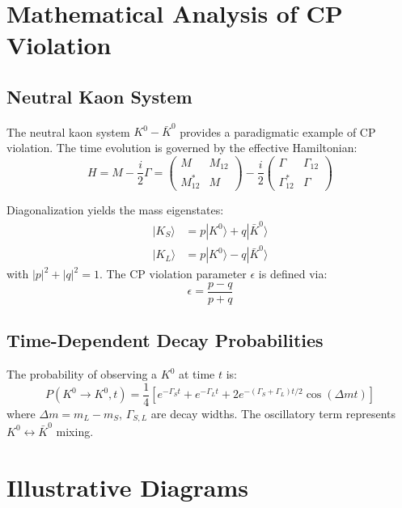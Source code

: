 \documentclass[12pt,a4paper]{article}
\begin{document}
\section{Mathematical Analysis of CP Violation}

\subsection{Neutral Kaon System}
The neutral kaon system $K^0-\bar{K}^0$ provides a paradigmatic example of CP violation. The time evolution is governed by the effective Hamiltonian:
\begin{equation}
H = M - \frac{i}{2} \Gamma =
\begin{pmatrix} M & M_{12} \\ M_{12}^* & M \end{pmatrix} - \frac{i}{2} \begin{pmatrix} \Gamma & \Gamma_{12} \\ \Gamma_{12}^* & \Gamma \end{pmatrix}
\end{equation}

Diagonalization yields the mass eigenstates:
\begin{align}
|K_S\rangle &= p |K^0\rangle + q |\bar{K}^0\rangle \\
|K_L\rangle &= p |K^0\rangle - q |\bar{K}^0\rangle
\end{align}
with $|p|^2 + |q|^2 = 1$. The CP violation parameter $\epsilon$ is defined via:
\begin{equation}
\epsilon = \frac{p - q}{p + q}
\end{equation}

\subsection{Time-Dependent Decay Probabilities}
The probability of observing a $K^0$ at time $t$ is:
\begin{equation}
P(K^0 \to K^0,t) = \frac{1}{4} \left[ e^{-\Gamma_S t} + e^{-\Gamma_L t} + 2 e^{-(\Gamma_S+\Gamma_L)t/2} \cos(\Delta m t) \right]
\end{equation}
where $\Delta m = m_L - m_S$, $\Gamma_{S,L}$ are decay widths. The oscillatory term represents $K^0 \leftrightarrow \bar{K}^0$ mixing.

\section{Illustrative Diagrams}
\end{document}
